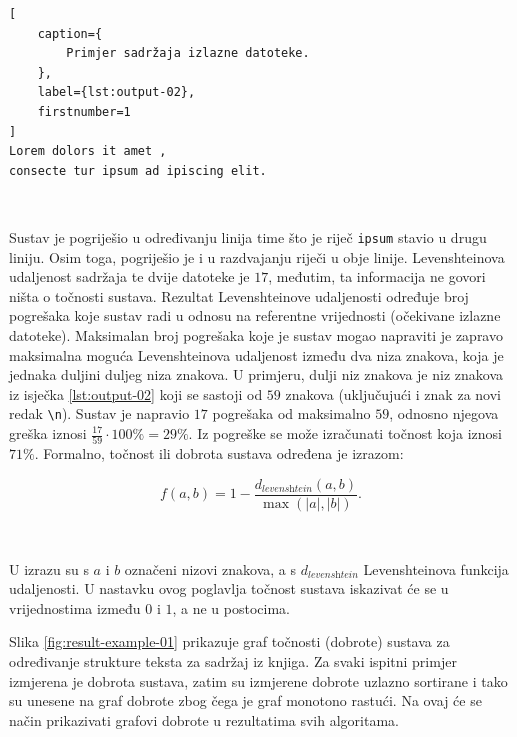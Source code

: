 \documentclass[times, utf8, zavrsni]{fer}
\begin{document}
\pagebreak

\begin{lstlisting}[
    caption={
        Primjer sadržaja izlazne datoteke.
    },
    label={lst:output-02},
    firstnumber=1
]
Lorem dolors it amet ,
consecte tur ipsum ad ipiscing elit.
\end{lstlisting}

\

Sustav je pogriješio u određivanju linija time što je riječ \lstinline{ipsum}
stavio u drugu liniju. Osim toga, pogriješio je i u razdvajanju riječi u obje
linije. Levenshteinova udaljenost sadržaja te dvije datoteke je $17$, međutim,
ta informacija ne govori ništa o točnosti sustava. Rezultat Levenshteinove
udaljenosti određuje broj pogrešaka koje sustav radi u odnosu na referentne
vrijednosti (očekivane izlazne datoteke). Maksimalan broj pogrešaka koje je
sustav mogao napraviti je zapravo maksimalna moguća Levenshteinova udaljenost
između dva niza znakova, koja je jednaka duljini duljeg niza znakova. U
primjeru, dulji niz znakova je niz znakova iz isječka
\ref{lst:output-02} koji se sastoji od $59$ znakova (uključujući i znak za novi
redak \lstinline{\n}). Sustav je napravio $17$ pogrešaka od maksimalno $59$,
odnosno njegova greška iznosi $\frac{17}{59} \cdot 100\% = 29\%$. Iz pogreške
se može izračunati točnost koja iznosi $71\%$.
Formalno, točnost ili dobrota  sustava određena je izrazom:

\begin{equation}
\label{eq:fitness}
f(a, b) = 1 - \frac{d_\textit{levenshtein}(a, b)}{\max(|a|, |b|)} \texttt{.}
\end{equation}

\

U izrazu su s $a$ i $b$ označeni nizovi znakova, a s
$d_\textit{levenshtein}$ Levenshteinova funkcija udaljenosti. U nastavku ovog
poglavlja točnost sustava iskazivat će se u vrijednostima
između $0$ i $1$, a ne u postocima.

Slika \ref{fig:result-example-01} prikazuje graf točnosti (dobrote) sustava za
određivanje strukture teksta za sadržaj iz knjiga. Za svaki ispitni
primjer izmjerena je dobrota sustava, zatim su izmjerene dobrote uzlazno
sortirane i tako su unesene na graf dobrote zbog čega je graf monotono
rastući. Na ovaj će se način prikazivati grafovi dobrote u rezultatima svih
algoritama.
\end{document}
